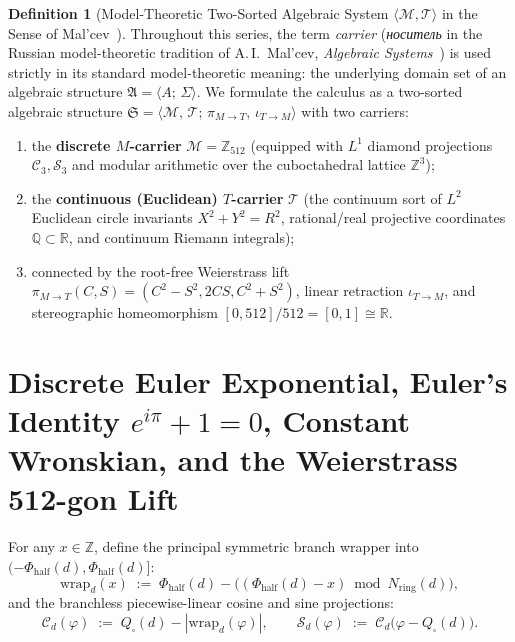 \documentclass[11pt,a4paper]{article}
\theoremstyle{plain}
\theoremstyle{definition}
\newtheorem{definition}[theorem]{Definition}
\begin{document}
\begin{definition}[Model-Theoretic Two-Sorted Algebraic System $\langle\mathcal{M},\mathcal{T}\rangle$ in the Sense of Mal'cev~\cite{Malcev1973}]
\label{def:malcev-carriers}
Throughout this series, the term \emph{carrier} (\emph{носитель} in the Russian model-theoretic tradition of A.\,I.~Mal'cev, \emph{Algebraic Systems}~\cite{Malcev1973}) is used strictly in its standard model-theoretic meaning: the underlying domain set of an algebraic structure $\mathfrak{A} = \langle A;\,\Sigma\rangle$. We formulate the calculus as a two-sorted algebraic structure $\mathfrak{S} = \langle \mathcal{M},\,\mathcal{T};\,\pi_{M\to T},\,\iota_{T\to M}\rangle$ with two carriers:
\begin{enumerate}[leftmargin=*,noitemsep]
\item the \textbf{discrete $M$-carrier} $\mathcal{M} = \mathbb{Z}_{512}$ (equipped with $L^1$ diamond projections $\mathcal{C}_3,\mathcal{S}_3$ and modular arithmetic over the cuboctahedral lattice $\mathbb{Z}^3$);
\item the \textbf{continuous (Euclidean) $T$-carrier} $\mathcal{T}$ (the continuum sort of $L^2$ Euclidean circle invariants $X^2+Y^2=R^2$, rational/real projective coordinates $\mathbb{Q}\subset\mathbb{R}$, and continuum Riemann integrals);
\item connected by the root-free Weierstrass lift $\pi_{M\to T}(C,S) = (C^2-S^2,2CS,C^2+S^2)$, linear retraction $\iota_{T\to M}$, and stereographic homeomorphism $[0,512]/512 = [0,1] \cong \mathbb{R}$.
\end{enumerate}
\end{definition}

\section{Discrete Euler Exponential, Euler's Identity \texorpdfstring{$e^{i\pi}+1=0$}{e\^{}(i pi)+1=0}, Constant Wronskian, and the Weierstrass 512-gon Lift}
\label{sec:wronskian-euler}

For any $x\in\mathbb{Z}$, define the principal symmetric branch wrapper into $(-\Phi_{\mathrm{half}}(d),\Phi_{\mathrm{half}}(d)]$:
\begin{equation}
  \label{eq:wrap-ring}
  \mathrm{wrap}_d(x) \;:=\; \Phi_{\mathrm{half}}(d) - \bigl((\Phi_{\mathrm{half}}(d) - x) \bmod N_{\mathrm{ring}}(d)\bigr),
\end{equation}
and the branchless piecewise-linear cosine and sine projections:
\begin{equation}
  \label{eq:proj-cs}
  \mathcal{C}_d(\varphi) \;:=\; Q_\square(d) - |\mathrm{wrap}_d(\varphi)|,\qquad
  \mathcal{S}_d(\varphi) \;:=\; \mathcal{C}_d\bigl(\varphi - Q_\square(d)\bigr).
\end{equation}
\end{document}
